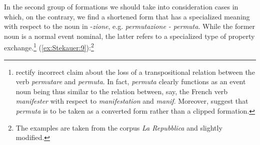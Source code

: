 \documentclass[output=paper]{langsci/langscibook}
\begin{document}
In the second group of formations we should take into consideration
cases in which, on the contrary, we find a shortened form that has a
specialized meaning with respect to the noun in -\emph{zione}, e.g.
\emph{permutazione - permuta}. While the former noun is a normal event
nominal, the latter refers to a specialized type of property
exchange.\footnote{%
\citet[196-198]{MonterminiThornton2014} %
%
rectify
%
incorrect claim about the loss of a
  transpositional relation between the verb \emph{permutare} and
  \emph{permuta}. In fact, \emph{permuta} clearly functions as an event
  noun being thus similar to the relation between, say, the French verb
  \emph{manifester} with respect to \emph{manifestation} and
  \emph{manif}. Moreover, %
\citet[198]{MonterminiThornton2014} %
%
suggest
  that \emph{permuta} is to be taken as a converted form rather than a
  clipped formation.} (\ref{ex:Stekauer:9}):\footnote{The examples are taken from the corpus
\emph{La Repubblica} and slightly modified.}
\end{document}

